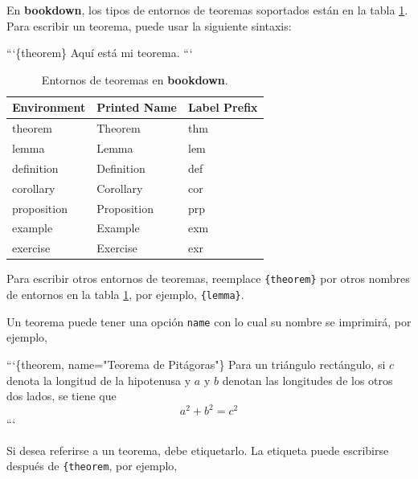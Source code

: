 \documentclass[12pt,]{krantz}
\makeatletter
\newenvironment{Shaded}{\begin{snugshade}}{\end{snugshade}}
\newcommand{\NormalTok}[1]{#1}
\newenvironment{kframe}{%
\medskip{}
\setlength{\fboxsep}{.8em}
 \def\at@end@of@kframe{}%
 \ifinner\ifhmode%
  \def\at@end@of@kframe{\end{minipage}}%
  \begin{minipage}{\columnwidth}%
 \fi\fi%
 \def\FrameCommand##1{\hskip\@totalleftmargin \hskip-\fboxsep
 \colorbox{shadecolor}{##1}\hskip-\fboxsep
     \hskip-\linewidth \hskip-\@totalleftmargin \hskip\columnwidth}%
 \MakeFramed {\advance\hsize-\width
   \@totalleftmargin\z@ \linewidth\hsize
   \@setminipage}}%
 {\par\unskip\endMakeFramed%
 \at@end@of@kframe}
\renewenvironment{Shaded}{\begin{kframe}}{\end{kframe}}
\theoremstyle{definition}
\theoremstyle{definition}
\theoremstyle{definition}
\theoremstyle{remark}
\makeatother
\begin{document}
En \textbf{bookdown}, los tipos de entornos de teoremas soportados están
en la tabla \ref{tab:theorem-envs}. Para escribir un teorema, puede usar
la siguiente sintaxis:

\begin{Shaded}
\begin{Highlighting}[]
\NormalTok{```\{theorem\}}
\NormalTok{Aquí está mi teorema.}
\NormalTok{```}
\end{Highlighting}
\end{Shaded}



\begin{table}

\caption{\label{tab:theorem-envs}Entornos de teoremas en \textbf{bookdown}.}
\centering
\begin{tabular}[t]{lll}
\toprule
Environment & Printed Name & Label Prefix\\
\midrule
theorem & Theorem & thm\\
lemma & Lemma & lem\\
definition & Definition & def\\
corollary & Corollary & cor\\
proposition & Proposition & prp\\
\addlinespace
example & Example & exm\\
exercise & Exercise & exr\\
\bottomrule
\end{tabular}
\end{table}

Para escribir otros entornos de teoremas, reemplace
\texttt{\textasciigrave{}\textasciigrave{}\textasciigrave{}\{theorem\}}
por otros nombres de entornos en la tabla \ref{tab:theorem-envs}, por
ejemplo,
\texttt{\textasciigrave{}\textasciigrave{}\textasciigrave{}\{lemma\}}.

Un teorema puede tener una opción \texttt{name} con lo cual su nombre se
imprimirá, por ejemplo,

\begin{Shaded}
\begin{Highlighting}[]
\NormalTok{```\{theorem, name="Teorema de Pitágoras"\}}
\NormalTok{Para un triángulo rectángulo, si $c$ denota la longitud de la hipotenusa}
\NormalTok{y $a$ y $b$ denotan las longitudes de los otros dos lados, se tiene que}
\NormalTok{$$a^2 + b^2 = c^2$$}
\NormalTok{```}
\end{Highlighting}
\end{Shaded}

Si desea referirse a un teorema, debe etiquetarlo. La etiqueta puede
escribirse después de
\texttt{\textasciigrave{}\textasciigrave{}\textasciigrave{}\{theorem},
por ejemplo,
\end{document}
